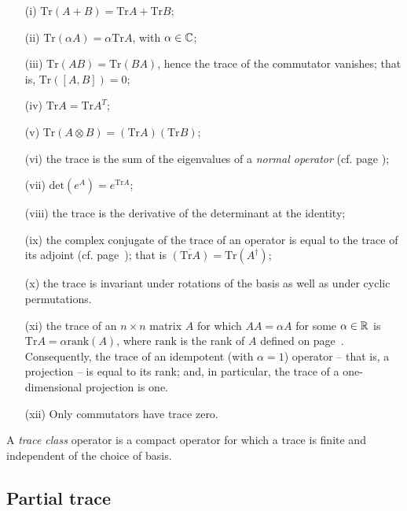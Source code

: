 \begin{itemize}
\item[(i)]
$\textrm{Tr}(A+B)=\textrm{Tr}A+\textrm{Tr}B$;
\item[(ii)]
$\textrm{Tr}(\alpha A)= \alpha \textrm{Tr}A$, with $\alpha \in {\Bbb C}$;
\item[(iii)]
$\textrm{Tr}(AB) = \textrm{Tr}(BA)$, hence the trace of the  commutator vanishes; that
is, $\textrm{Tr}([A,B])=0$;
\item[(iv)]
$\textrm{Tr}A = \textrm{Tr}A^T$;
\item[(v)]
$\textrm{Tr}(A\otimes B)= (\textrm{Tr}A) (\textrm{Tr}B)$;
\item[(vi)]
the trace is the sum of the eigenvalues of a {\em normal operator} (cf. page \pageref{2014-m-fdvs-normality});
\item[(vii)]
$ \textrm{det}(e^A)=e^{\textrm{Tr}A} $;
\item[(viii)]
 the trace is the derivative of the determinant at the identity;
\item[(ix)]
the complex conjugate of the trace of an operator is equal to the trace of its adjoint
(cf. page~\pageref{2014-m-fdvs-adjoint}); that is
$\overline{(  \textrm{Tr} A)}=\textrm{Tr} (A^\dagger)$;
\item[(x)]
the trace is invariant under rotations of the basis as well as
under cyclic permutations.
\item[(xi)]
the trace of an $n \times n$ matrix $A$ for which $AA=\alpha A$ for some $\alpha \in {\Bbb R}$ is
$ \textrm{Tr} A =
\alpha \textrm{rank}(A)$,
where  $\textrm{rank}$ is the rank of $A$ defined on page~\pageref{2014-m-fdvs-rank}.
Consequently, the trace of an idempotent (with $\alpha=1$) operator -- that is, a projection --
is equal to its rank;
and, in particular, the trace of a one-dimensional projection is one.
\item[(xii)]
Only commutators have trace zero.
\end{itemize}


A {\em trace class} operator is a compact operator for which a trace is finite and independent of the choice of basis.

\subsection{Partial trace}
\label{2015-partialtrace}

